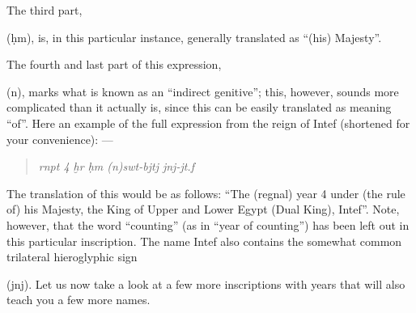 \documentclass[a5paper,twoside,11pt]{report}
\newcommand{\xHiero}{ḫ}
\newcommand{\HHiero}{ḥ}
\begin{document}
			The third part, \begin{hieroglyph}{\leavevmode {}}\end{hieroglyph} (ḥm), is, in this particular instance, generally translated as “(his) Majesty”.

			The fourth and last part of this expression, \begin{hieroglyph}{\leavevmode {}}\end{hieroglyph} (n), marks what is known as an “indirect genitive”; this, however, sounds more complicated than it actually is, since this can be easily translated as meaning “of”.
			Here an example of the full expression from the reign of Intef (shortened for your convenience): —

			\begin{quote}
				\begin{hieroglyph}{\leavevmode {}\HinterSignsSpace
{}\HinterSignsSpace
{}\HinterSignsSpace
{}\HinterSignsSpace
{}\HinterSignsSpace
\HfullSpace \HinterSignsSpace
{}\HinterSignsSpace
{}\HinterSignsSpace
{}%
}\end{hieroglyph}
				\newline
				\textit{rnpt 4 \xHiero r \HHiero m (n)swt-bjtj jnj-jt.f}
        \newline
        \parencite[p. 116]{scotthiero}
			\end{quote}

			The translation of this would be as follows: “The (regnal) year 4 under (the rule of) his Majesty, the King of Upper and Lower Egypt (Dual King), Intef”. Note, however, that the word “counting” (as in “year of counting”) has been left out in this particular inscription. The name Intef also contains the somewhat common trilateral hieroglyphic sign \begin{hieroglyph}{\leavevmode {}}\end{hieroglyph} (jnj).
      Let us now take a look at a few more inscriptions with years that will also teach you a few more names.
\end{document}
